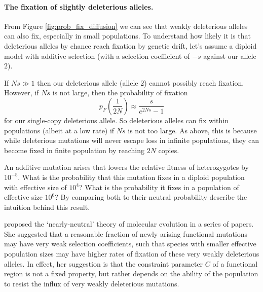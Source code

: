{%

\paragraph{The fixation of slightly deleterious alleles.}
From Figure \ref{fig:prob_fix_diffusion} we can see that weakly
deleterious alleles can also fix, especially in small populations.  To understand how
likely it is that deleterious alleles by chance reach fixation by
genetic drift, let's assume a diploid model with additive selection (with
a selection coefficient of $-s$ against our allele $2$).  

If $N s \gg 1$ then our deleterious allele (allele $2$) cannot possibly reach
fixation. However, if $Ns$ is not large, then the probability of fixation
\begin{equation}
p_F \left( \frac{1}{2N} \right) \approx \frac{s}{e^{2Ns}-1} \label{eqn:fix_deleterious}
\end{equation}
for our single-copy deleterious allele. So deleterious alleles can fix within
populations (albeit at a low rate) if $Ns$ is not too large. As above,
this is because while deleterious mutations will never escape loss in
infinite populations, they can become fixed in finite population by
reaching $2N$ copies. 

\begin{question}
An additive mutation arises that lowers the relative fitness of heterozygotes by $10^{-5}$. What is the probability that this mutation fixes in a diploid population with effective size of $10^4$? What is the probability it fixes in a population of effective size $10^6$? By comparing both to their neutral probability describe the intuition behind this result.
\end{question}

\citeauthor{ohta1973slightly}
proposed the `nearly-neutral' theory of
molecular evolution in a series of papers\cite{ohta1972population,ohta1973slightly,ohta1987very}. She suggested that a reasonable fraction of newly
arising functional mutations may have very weak selection
coefficients, such that species with smaller effective population sizes may
have higher rates of fixation of these very weakly deleterious
alleles. In effect, her suggestion is that the constraint parameter
$C$ of a functional region is not a fixed property, but rather depends
on the ability of the population to resist the influx of very weakly
deleterious mutations. 


}
